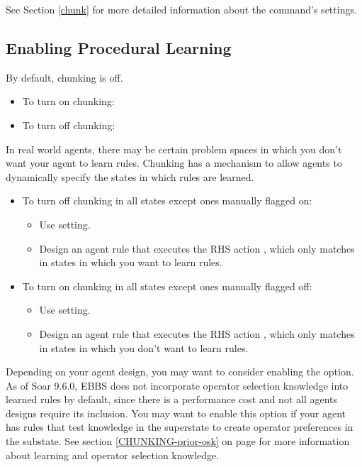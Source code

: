 See Section \ref{chunk} for more detailed information about the  command's settings.

\subsection{Enabling Procedural Learning}
\label{CHUNKING-usage-enable}

By default, chunking is off.

\begin{itemize}
	\item To turn on chunking: 
	\item To turn off chunking: 
\end{itemize}

In real world agents, there may be certain problem spaces in which you don't want your agent to learn rules.  Chunking has a mechanism to allow agents to dynamically specify the states in which rules are learned.

\begin{itemize}
	\item To turn off chunking in all states except ones manually flagged on:
	\begin{itemize}
		\item Use  setting.
		\item Design an agent rule that executes the RHS action , which only matches in states in which you want to learn rules.
	\end{itemize}
	\item To turn on chunking in all states except ones manually flagged off:
	\begin{itemize}
		\item Use  setting.
		\item Design an agent rule that executes the RHS action , which only matches in states in which you don't want to learn rules.
	\end{itemize}
\end{itemize}

Depending on your agent design, you may want to consider enabling the  option.  As of Soar 9.6.0, EBBS does not incorporate operator selection knowledge into learned rules by default, since there is a performance cost and not all agents designs require its inclusion.  You may want to enable this option if your agent has rules that test knowledge in the superstate to create operator preferences in the substate.  See section \ref{CHUNKING-prior-osk} on page \pageref{CHUNKING-prior-osk} for more information about learning and operator selection knowledge.

